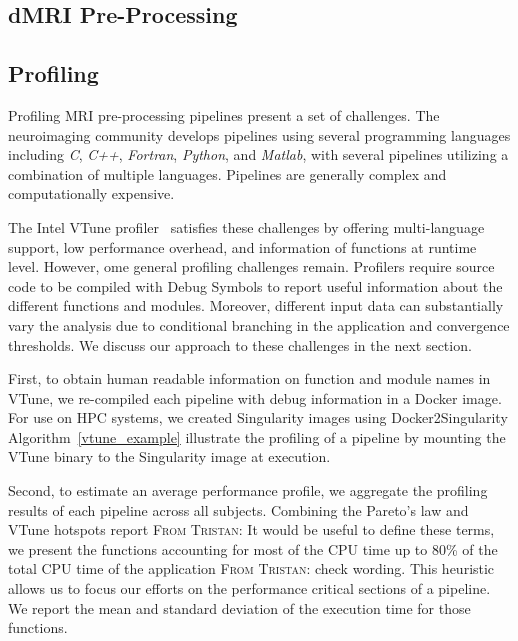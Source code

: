 \documentclass[conference]{IEEEtran}
\renewcommand{\lstlistingname}{Algorithm}
\newcommand{\TG}[1]{\color{blue}\textsc{From Tristan: }#1\color{black}}
\begin{document}
\subsection{dMRI Pre-Processing}


\subsection{Profiling}
Profiling MRI pre-processing pipelines present a set of challenges. The neuroimaging community develops pipelines using several programming languages including \textit{C}, \textit{C++}, \textit{Fortran}, \textit{Python}, and \textit{Matlab}, with several pipelines utilizing a combination of multiple languages. Pipelines are generally complex and computationally expensive.

The Intel VTune profiler~\cite{vtune_profiler} satisfies these challenges by offering multi-language support, low performance overhead, and information of functions at runtime level. However, ome general profiling challenges remain. Profilers require source code to be compiled with Debug Symbols to report useful information about the different functions and modules. Moreover, different input data can substantially vary the analysis due to conditional branching in the application and convergence thresholds. We discuss our approach to these challenges in the next section.

First, to obtain human readable information on function and module names in VTune, we re-compiled each pipeline with debug information in a Docker image. For use on HPC systems, we created Singularity images using Docker2Singularity \lstlistingname~\ref{vtune_example} illustrate the profiling of a pipeline by mounting the VTune binary to the Singularity image at execution.


Second, to estimate an average performance profile, we aggregate the profiling results of each pipeline across all subjects. Combining the Pareto's law and VTune hotspots report \TG{It would be useful to define these terms}, we present the functions accounting for most of the CPU time up to 80\% of the total CPU time of the application \TG{check wording}. This heuristic allows us to focus our efforts on the performance critical sections of a pipeline. We report the mean and standard deviation of the execution time for those functions.
\end{document}
